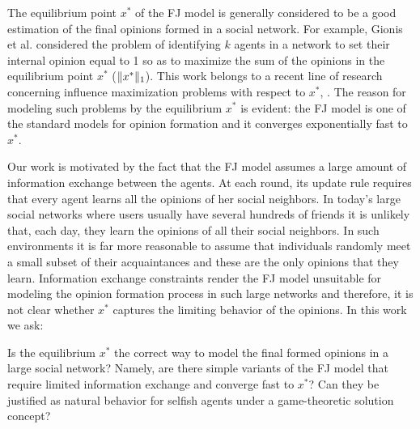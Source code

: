 The equilibrium point $x^*$ of the FJ model is generally considered to be a
good estimation of the final opinions formed in a social network. For example,
Gionis et al.  \cite{GTT13} considered the problem of identifying $k$ agents in
a network to set their internal opinion equal to 1 so as to maximize the sum
of the opinions in the equilibrium point $x^*$ ($\norm{1}{x^*}$). This work
belongs to a recent line of research concerning influence maximization problems
with respect to $x^*$, \cite{GTT13,AKPT18,MMT17}. The reason for modeling such
problems by the equilibrium $x^*$ is evident: the FJ model is one of the
standard models for opinion formation and it converges exponentially fast to
$x^*$.

Our work is motivated by the fact that the FJ model assumes a large amount of
information exchange between the agents. At each round, its update rule
requires that every agent learns all the opinions of her social neighbors.  In
today's large social networks where users usually have several hundreds of
friends it is unlikely that, each day, they learn the opinions of all their
social neighbors.  In such environments it is far more reasonable to assume
that individuals randomly meet a small subset of their acquaintances and these
are the only opinions that they learn.  Information exchange constraints
render the FJ model unsuitable for modeling the opinion formation process in
such large networks and therefore, it is not clear whether $x^*$ captures the
limiting behavior of the opinions. In this work we ask:
%
\begin{question}\label{q:motivation1}
  Is the equilibrium $x^*$ the correct way to model the final formed opinions
  in a large social network? Namely, are there simple variants of the FJ model
  that require limited information exchange and converge fast to $x^*$? Can
  they be justified as natural behavior for selfish agents under a
  game-theoretic solution concept?
\end{question}

